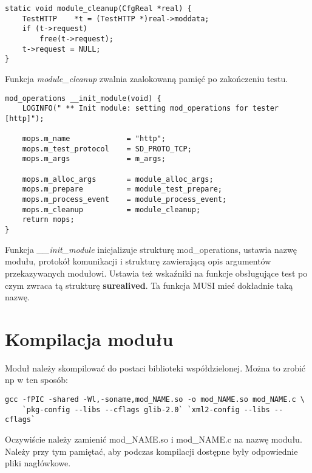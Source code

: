\documentclass[polish,12pt]{article}
\begin{document}
\begin{verbatim}
static void module_cleanup(CfgReal *real) {
    TestHTTP    *t = (TestHTTP *)real->moddata;
    if (t->request)
        free(t->request);
    t->request = NULL;
}
\end{verbatim}
Funkcja \textit{module\_cleanup} zwalnia zaalokowaną pamięć po zakończeniu testu.
\newpage
{\small
\begin{verbatim}
mod_operations __init_module(void) {
    LOGINFO(" ** Init module: setting mod_operations for tester [http]");

    mops.m_name             = "http";
    mops.m_test_protocol    = SD_PROTO_TCP;
    mops.m_args             = m_args;

    mops.m_alloc_args       = module_alloc_args;
    mops.m_prepare          = module_test_prepare;
    mops.m_process_event    = module_process_event;
    mops.m_cleanup          = module_cleanup;
    return mops;
}
\end{verbatim}
}
Funkcja \textit{\_\_init\_module} inicjalizuje strukturę mod\_operations,
ustawia nazwę modułu, protokół komunikacji i strukturę zawierającą opis
argumentów przekazywanych modułowi. Ustawia też wskaźniki na funkcje obsługujące test
po czym zwraca tą strukturę \textbf{surealived}.
Ta funkcja MUSI mieć dokładnie taką nazwę.

\section{Kompilacja modułu}
Moduł należy skompilować do postaci biblioteki współdzielonej. Można to zrobić np w ten sposób:
\begin{verbatim}
gcc -fPIC -shared -Wl,-soname,mod_NAME.so -o mod_NAME.so mod_NAME.c \
    `pkg-config --libs --cflags glib-2.0` `xml2-config --libs --cflags`
\end{verbatim}
Oczywiście należy zamienić mod\_NAME.so i mod\_NAME.c na nazwę modułu.
Należy przy tym pamiętać, aby podczas kompilacji dostępne były odpowiednie pliki nagłówkowe.
\end{document}
